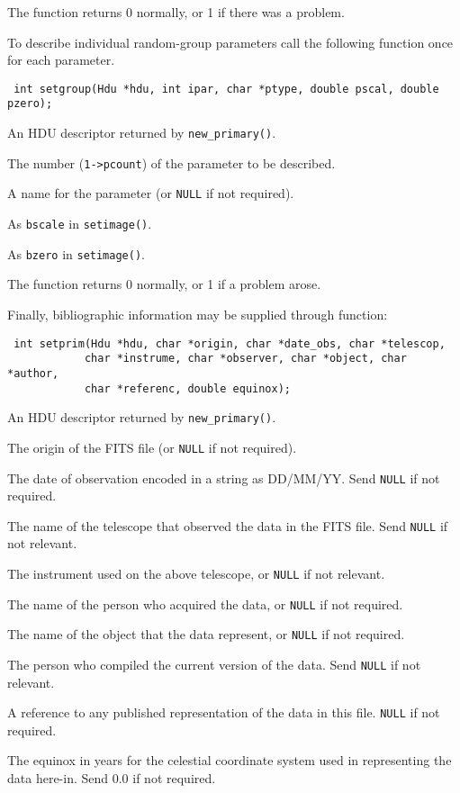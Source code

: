 The function returns 0 normally, or 1 if there was a problem.


To describe individual random-group parameters call the following
function once for each parameter.
\label{setgroup}\begin{verbatim}
 int setgroup(Hdu *hdu, int ipar, char *ptype, double pscal, double pzero);
\end{verbatim}
\begin{arglist}
   An HDU descriptor returned by \verb`new_primary()`.

  The number (\verb`1->pcount`) of the parameter to
                    be described.

 A name for the parameter (or \verb`NULL` if not required).

 As \verb`bscale` in \verb`setimage()`.

 As \verb`bzero` in \verb`setimage()`.
\end{arglist}
The function returns 0 normally, or 1 if a problem arose.


Finally, bibliographic information may be supplied through function:
\label{setprim}\begin{verbatim}
 int setprim(Hdu *hdu, char *origin, char *date_obs, char *telescop,
            char *instrume, char *observer, char *object, char *author,
            char *referenc, double equinox);
\end{verbatim}
\begin{arglist}

  An HDU descriptor returned by \verb`new_primary()`.

  The origin of the FITS file (or \verb`NULL` if not required).

 The date of observation encoded in a string as
             DD/MM/YY. Send \verb`NULL` if not required.

 The name of the telescope that observed the data in the
             FITS file. Send \verb`NULL` if not relevant.

 The instrument used on the above telescope, or \verb`NULL` if
             not relevant.

 The name of the person who acquired the data, or \verb`NULL`
             if not required.

  The name of the object that the data represent, or \verb`NULL`
             if not required.

  The person who compiled the current version of the data.
             Send \verb`NULL` if not relevant.

 A reference to any published representation of the
             data in this file. \verb`NULL` if not required.

 The equinox in years for the celestial coordinate
             system used in representing the data here-in. Send 0.0
             if not required.
\end{arglist}

